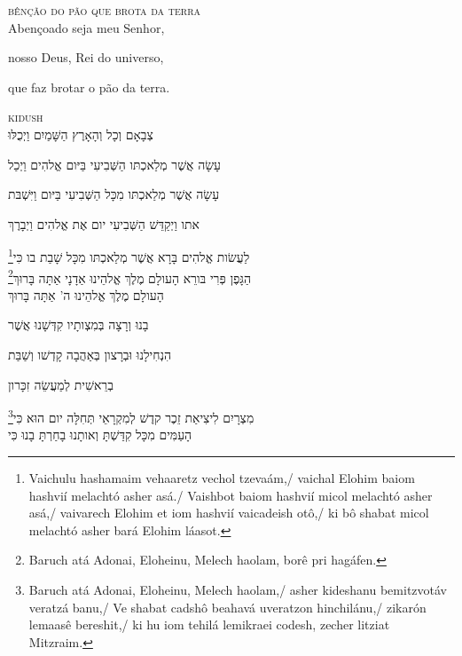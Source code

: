\vspace*{1cm}

\textsc{bênção do pão que brota da terra}\\[15pt]

Abençoado seja meu Senhor,

nosso Deus, Rei do universo,

que faz brotar o pão da terra.


\movetoevenpage
\raggedleft


\vspace*{1cm}

\textsc{kidush}\\[15pt]

צְבָאָם וְכָל וְהָאָרֶץ הַשָּׁמַיִם וַיְכֻלּוּ 

עָשָׂה אֲשֶׁר מְלַאכְתּו הַשְּׁבִיעִי בַּיּום אֱלהִים וַיְכַל 

עָשָׂה אֲשֶׁר מְלַאכְתּו מִכָּל הַשְּׁבִיעִי בַּיּום וַיִּשְׁבּת 

אתו וַיְקַדֵּשׁ הַשְּׁבִיעִי יום אֶת אֱלהִים וַיְבָרֶךְ 

\footnote{Vaichulu hashamaim vehaaretz vechol tzevaám,/ vaichal Elohim baiom hashvií melachtó asher asá./ Vaishbot baiom hashvií micol melachtó asher asá,/ vaivarech Elohim et iom hashvií vaicadeish otô,/ ki bô shabat micol melachtó asher bará Elohim láasot.}לַעֲשׂות אֱלהִים בָּרָא אֲשֶׁר מְלַאכְתּו מִכָּל שָׁבַת בו כִּי\\[10pt] 

\footnote{Baruch atá Adonai, Eloheinu, Melech haolam, borê pri hagáfen.}הַגָּפֶן פְּרִי בּורֵא הָעולָם מֶלֶךְ אֱלהֵינוּ אַדָנָי אַתָּה בָּרוּךְ\\[10pt] %

הָעולָם מֶלֶךְ אֱלהֵינוּ ה' אַתָּה בָּרוּךְ

בָנוּ וְרָצָה בְּמִצְותָיו קִדְּשָׁנוּ אֲשֶׁר

הִנְחִילָנוּ וּבְרָצון בְּאַהֲבָה קָדְשׁו וְשַׁבַּת

בְרֵאשִׁית לְמַעֲשֵׂה זִכָּרון

\footnote{Baruch atá Adonai, Eloheinu, Melech haolam,/ asher kideshanu bemitzvotáv veratzá banu,/ Ve shabat cadshô beahavá uveratzon hinchilánu,/ zikarón lemaasê bereshit,/ ki hu iom tehilá lemikraei codesh, zecher litziat Mitzraim.}מִצְרָיִם לִיצִיאַת זֵכֶר קדֶשׁ לְמִקְרָאֵי תְּחִלָּה יום הוּא כִּי\\[10pt]

הָעַמִּים מִכָּל קִדַּשְׁתָּ וְאותָנוּ בָחַרְתָּ בָנוּ כִּי


